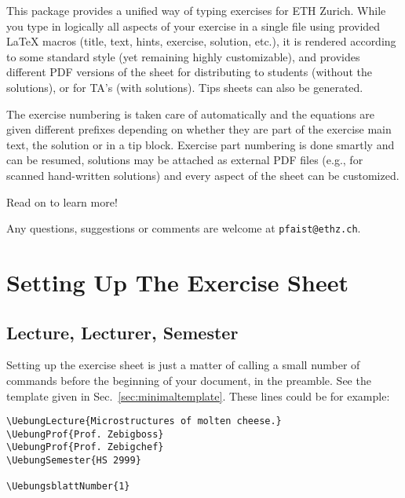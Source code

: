 \documentclass[11pt,a4paper]{article}
\begin{document}
This package provides a unified way of typing exercises for ETH Zurich. While you type in
logically all aspects of your exercise in a single file using provided \LaTeX{} macros
(title, text, hints, exercise, solution, etc.), it is rendered according to some standard
style (yet remaining highly customizable), and provides different PDF versions of the
sheet for distributing to students (without the solutions), or for TA's (with
solutions). Tips sheets can also be generated. 

The exercise numbering is taken care of automatically and the equations are given
different prefixes depending on whether they are part of the exercise main text, the
solution or in a tip block. Exercise part numbering is done smartly and can be resumed,
solutions may be attached as external PDF files (e.g., for scanned hand-written solutions)
and every aspect of the sheet can be customized.

Read on to learn more!

Any questions, suggestions or comments are welcome at \texttt{pfaist{@}ethz.ch}.



\section{Setting Up The Exercise Sheet}
\label{sec:SetupSheet}

\subsection{Lecture, Lecturer, Semester}

Setting up the exercise sheet is just a matter of calling a small number of commands
before the beginning of your document, in the preamble. See the template given in
Sec.~\ref{sec:minimaltemplate}. These lines could be for example:
\begin{pkgverbatim}
\begin{verbatim}
\UebungLecture{Microstructures of molten cheese.}
\UebungProf{Prof. Zebigboss}
\UebungProf{Prof. Zebigchef}
\UebungSemester{HS 2999}

\UebungsblattNumber{1}
\end{verbatim}
\end{pkgverbatim}

\end{document}
